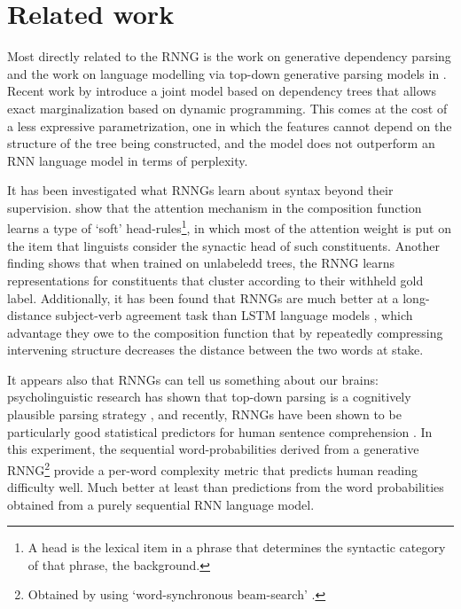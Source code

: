 \section{Related work}

  Most directly related to the RNNG is the work on generative dependency parsing \citep{titov2007generative,buys2015bayesian,buys2015generative,buys2018exact} and the work on language modelling via top-down generative parsing models in \citet{roark2001probabilistic}. Recent work by \citep{buys2018exact} introduce a joint model based on dependency trees that allows exact marginalization based on dynamic programming. This comes at the cost of a less expressive parametrization, one in which the features cannot depend on the structure of the tree being constructed, and the model does not outperform an RNN language model in terms of perplexity.

  It has been investigated what RNNGs learn about syntax beyond their supervision. \citet{kuncoro2017syntax} show that the attention mechanism in the composition function learns a type of `soft' head-rules\footnote{A head is the lexical item in a phrase that determines the syntactic category of that phrase, \cf the background.}, in which most of the attention weight is put on the item that linguists consider the synactic head of such constituents. Another finding shows that when trained on unlabeledd trees, the RNNG learns representations for constituents that cluster according to their withheld gold label. Additionally, it has been found that RNNGs are much better at a long-distance subject-verb agreement task than LSTM language models \citep{linzen2016syntax,kuncoro2018learn}, which advantage they owe to the composition function that by repeatedly compressing intervening structure decreases the distance between the two words at stake.

  It appears also that RNNGs can tell us something about our brains: psycholinguistic research has shown that top-down parsing is a cognitively plausible parsing strategy \citep{brennan2016abstract}, and recently, RNNGs have been shown to be particularly good statistical predictors for human sentence comprehension \citep{hale2018beam}. In this experiment, the sequential word-probabilities derived from a generative RNNG\footnote{Obtained by using `word-synchronous beam-search' \citep{stern2017beam}.} provide a per-word complexity metric that predicts human reading difficulty well. Much better at least than predictions from the word probabilities obtained from a purely sequential RNN language model.
